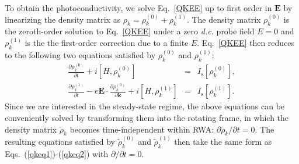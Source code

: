 \documentclass[reprint,amsmath,amssymb,aps,prb]{revtex4-1}
\begin{document}
To obtain the photoconductivity, we solve Eq.~\eqref{QKEE} up to first order in $\bm{E}$ by linearizing the density matrix as $\rho_k=\rho_k^{(0)}+\rho_k^{(1)}$.  The density matrix $\rho_k^{(0)}$ is the zeroth-order  solution to Eq.~\eqref{QKEE} under a zero \textit{d.c.} probe field ${E} = 0$ and $\rho_k^{(1)}$ is the the first-order correction due to a finite ${E}$. Eq.~\eqref{QKEE} then reduces to the following two equations satisfied by $\rho_k^{(0)}$ and $\rho_k^{(1)}$:
%
\begin{eqnarray}  
\frac{\partial \rho_k^{(0)}}{\partial t}+i\left[H,\rho_k^{(0)}\right] &=& I_{\mathrm{s}}[\rho_k^{(0)}], \label{qkeq1} \\
\frac{\partial \rho_k^{(1)}}{\partial t}-e\bm{E}\cdot\frac{\partial \rho_k^{(0)}}{\partial \bm{k}}+i\left[H,\rho_k^{(1)}\right] &=& I_{\mathrm{s}}[\rho_k^{(1)}]. \label{qkeq2} 
\end{eqnarray}
%
Since we are interested in the steady-state regime, the above equations can be conveniently solved by transforming them into the rotating frame, in which the density matrix $\tilde{\rho}_k$ 
becomes time-independent within RWA: $\partial \tilde{\rho}_k/ \partial t = 0$. The resulting equations satisfied by $\tilde{\rho}_k^{(0)}$ and $\tilde{\rho}_k^{(1)}$ then take the same form as Eqs.~(\ref{qkeq1})-(\ref{qkeq2}) with $\partial/\partial t = 0$.
\end{document}
